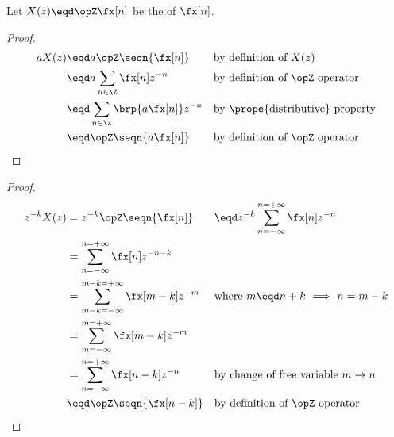 \begin{theorem}
Let $X(z)\eqd\opZ\fx[n]$ be the  of $\fx[n]$.
\end{theorem}
\begin{proof}
\begin{align*}
  a X(z)
    &\eqd a \opZ \seqn{\fx[n]}                && \text{by definition of $X(z)$}
  \\&\eqd a \sum_{n\in\Z} \fx[n] z^{-n}       && \text{by definition of $\opZ$ operator}
  \\&\eqd \sum_{n\in\Z} \brp{a \fx[n]} z^{-n} && \text{by \prope{distributive} property}
  \\&\eqd \opZ\seqn{a\fx[n]}                  && \text{by definition of $\opZ$ operator}
\end{align*}
\end{proof}

\begin{theorem}
\end{theorem}
\begin{proof}
\begin{align*}
  z^{-k}X(z) 
    &= z^{-k} \opZ\seqn{\fx[n]}
   &&\eqd z^{-k}\sum_{n=-\infty}^{n=+\infty} \fx[n] z^{-n}
  \\&=          \sum_{n=-\infty}^{n=+\infty} \fx[n] z^{-n-k}
  \\&=          \sum_{m-k=-\infty}^{m-k=+\infty} \fx[m-k] z^{-m}
    && \text{where $m\eqd n+k$ $\implies$ $n=m-k$}
  \\&=          \sum_{m=-\infty}^{m=+\infty} \fx[m-k] z^{-m}
  \\&=          \sum_{n=-\infty}^{n=+\infty} \fx[n-k] z^{-n}
    && \text{by change of free variable $m\rightarrow n$}
  \\&\eqd \opZ\seqn{\fx[n-k]}
    && \text{by definition of $\opZ$ operator}
\end{align*}
\end{proof}

